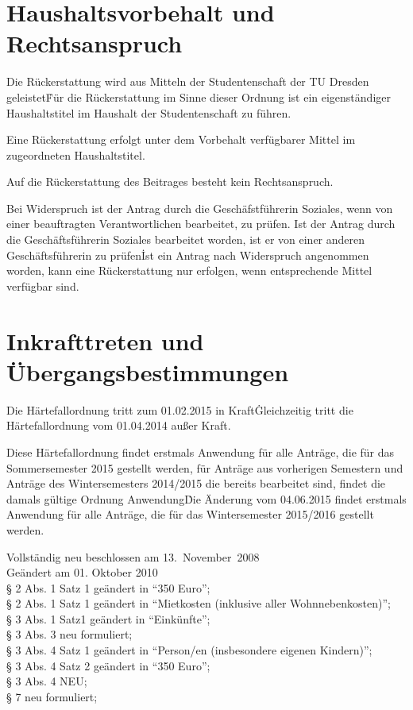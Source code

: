 \begin{multicols}{2}
\section{Haushaltsvorbehalt und Rechtsanspruch}
\Abs \Satz Die Rückerstattung wird aus Mitteln der Studentenschaft der TU Dresden geleistet\. Für die Rückerstattung im Sinne dieser Ordnung ist ein eigenständiger Haushaltstitel im Haushalt der Studentenschaft zu führen.

\Abs \Satz Eine Rückerstattung erfolgt unter dem Vorbehalt verfügbarer Mittel im zugeordneten Haushaltstitel.

\Abs \Satz Auf die Rückerstattung des Beitrages besteht kein Rechtsanspruch.

\Abs \Satz Bei Widerspruch ist der Antrag durch die Geschäfstführerin Soziales, wenn von einer beauftragten Verantwortlichen bearbeitet, zu prüfen. Ist der Antrag durch die Geschäftsführerin Soziales bearbeitet worden, ist er von einer anderen Geschäftsführerin zu prüfen\.
Ist ein Antrag nach Widerspruch angenommen worden, kann eine Rückerstattung nur erfolgen, wenn entsprechende Mittel verfügbar sind.


\section{Inkrafttreten und Übergangsbestimmungen}
\Abs \Satz Die Härtefallordnung tritt zum 01.02.2015 in Kraft\. Gleichzeitig tritt die Härtefallordnung vom 01.04.2014 außer Kraft.

\Abs \Satz Diese Härtefallordnung findet erstmals Anwendung für alle Anträge, die für das Sommersemester 2015 gestellt werden, für Anträge aus vorherigen Semestern und Anträge des Wintersemesters 2014/2015 die bereits bearbeitet sind, findet die damals gültige Ordnung Anwendung\. Die Änderung vom 04.06.2015 findet erstmals Anwendung für alle Anträge, die für das Wintersemester 2015/2016 gestellt werden.

\end{multicols}

\nopagebreak
\vspace{1cm}



\footnotesize

Vollständig neu beschlossen am 13.~November~2008\\

Geändert am 01. Oktober 2010 \\
§ 2 Abs. 1 Satz 1 geändert in "`350 Euro"'; \\
§ 2 Abs. 1 Satz 1 geändert in "`Mietkosten (inklusive aller Wohnnebenkosten)"'; \\
§ 3 Abs. 1 Satz1 geändert in "`Einkünfte"'; \\
§ 3 Abs. 3 neu formuliert; \\
§ 3 Abs. 4 Satz 1 geändert in "`Person/en (insbesondere eigenen Kindern)"'; \\
§ 3 Abs. 4 Satz 2 geändert in "`350 Euro"'; \\
§ 3 Abs. 4 NEU; \\
§ 7 neu formuliert; \\


